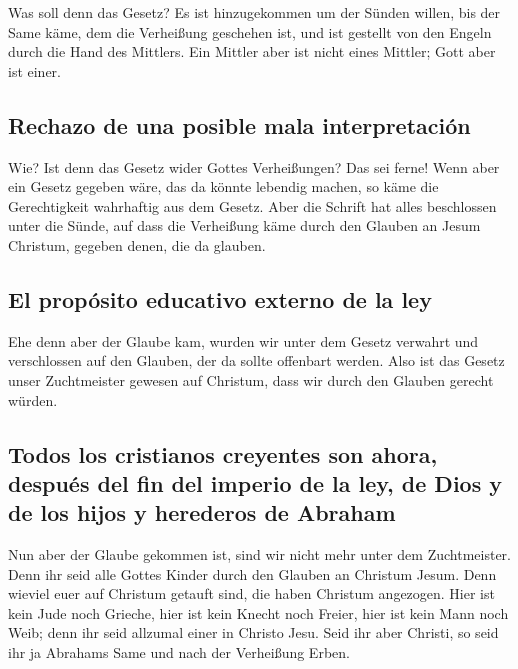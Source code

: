  Was soll denn das Gesetz? Es ist hinzugekommen um der
Sünden willen, bis der Same käme, dem die Verheißung geschehen ist, und
ist gestellt von den Engeln durch die Hand des Mittlers. 
Ein Mittler aber ist nicht eines Mittler; Gott aber ist einer.

\hypertarget{rechazo-de-una-posible-mala-interpretaciuxf3n}{%
\subsection{Rechazo de una posible mala
interpretación}\label{rechazo-de-una-posible-mala-interpretaciuxf3n}}

 Wie? Ist denn das Gesetz wider Gottes Verheißungen? Das
sei ferne! Wenn aber ein Gesetz gegeben wäre, das da könnte lebendig
machen, so käme die Gerechtigkeit wahrhaftig aus dem Gesetz.
 Aber die Schrift hat alles beschlossen unter die Sünde,
auf dass die Verheißung käme durch den Glauben an Jesum Christum,
gegeben denen, die da glauben.

\hypertarget{el-propuxf3sito-educativo-externo-de-la-ley}{%
\subsection{El propósito educativo externo de la
ley}\label{el-propuxf3sito-educativo-externo-de-la-ley}}

 Ehe denn aber der Glaube kam, wurden wir unter dem
Gesetz verwahrt und verschlossen auf den Glauben, der da sollte
offenbart werden.  Also ist das Gesetz unser Zuchtmeister
gewesen auf Christum, dass wir durch den Glauben gerecht würden.

\hypertarget{todos-los-cristianos-creyentes-son-ahora-despuuxe9s-del-fin-del-imperio-de-la-ley-de-dios-y-de-los-hijos-y-herederos-de-abraham}{%
\subsection{Todos los cristianos creyentes son ahora, después del fin
del imperio de la ley, de Dios y de los hijos y herederos de
Abraham}\label{todos-los-cristianos-creyentes-son-ahora-despuuxe9s-del-fin-del-imperio-de-la-ley-de-dios-y-de-los-hijos-y-herederos-de-abraham}}

 Nun aber der Glaube gekommen ist, sind wir nicht mehr
unter dem Zuchtmeister.  Denn ihr seid alle Gottes Kinder
durch den Glauben an Christum Jesum.  Denn wieviel euer
auf Christum getauft sind, die haben Christum angezogen. 
Hier ist kein Jude noch Grieche, hier ist kein Knecht noch Freier, hier
ist kein Mann noch Weib; denn ihr seid allzumal einer in Christo Jesu.
 Seid ihr aber Christi, so seid ihr ja Abrahams Same und
nach der Verheißung Erben.

